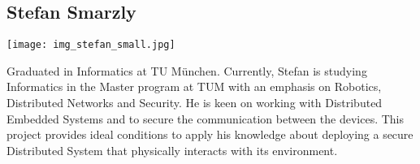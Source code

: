 \subsection{Stefan Smarzly}
%
\begin{minipage}{0.2\textwidth}
\begin{flushleft}
	\texttt{[image: img\_stefan\_small.jpg]}
\end{flushleft}
\end{minipage}
\hfill
\begin{minipage}{0.8\textwidth}
%
Graduated in Informatics at TU München. Currently, Stefan is studying Informatics in the Master program at TUM with an emphasis on Robotics, Distributed Networks and Security.
He is keen on working with Distributed Embedded Systems and to secure the communication between the devices.
This project provides ideal conditions to apply his knowledge about deploying a secure Distributed System that physically interacts with its environment.
%
\end{minipage}